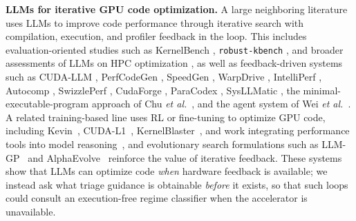 \noindent\textbf{LLMs for iterative GPU code optimization.}
A large neighboring literature uses LLMs to improve code performance through iterative search with compilation, execution, and profiler feedback in the loop.
This includes evaluation-oriented studies such as KernelBench \cite{ouyangKernelBenchCanLLMs2025}, \texttt{robust-kbench} \cite{langeRobustAgenticCUDA2025}, and broader assessments of LLMs on HPC optimization \cite{bowencuiLargeLanguageModels2025,cuiComprehensiveEvaluationLLMs2025}, as well as feedback-driven systems such as CUDA-LLM \cite{chenCUDALLMLLMsCan2025}, PerfCodeGen \cite{pengPerfCodeGenImprovingPerformance2025}, SpeedGen \cite{purschkeSpeedGenEnhancingCode2025}, WarpDrive \cite{damaniWarpDriveAgenticWorkflow}, IntelliPerf \cite{awadIntelliPerfLLMPoweredAutonomous2025}, Autocomp \cite{hongAutocompPowerfulPortable2025}, SwizzlePerf \cite{tschandSwizzlePerfHardwareAwareLLMs2025}, CudaForge \cite{zhangCudaForgeAgentFramework2025}, ParaCodex \cite{kaplanParaCodexProfilingGuidedAutonomous2026}, SysLLMatic \cite{pengSysLLMaticLargeLanguage2025}, the minimal-executable-program approach of Chu \textit{et al.}~\cite{chuGPUKernelOptimization2025}, and the agent system of Wei \textit{et al.}~\cite{weiImprovingParallelProgram2024}.
A related training-based line uses RL or fine-tuning to optimize GPU code, including Kevin~\cite{baronioKevinMultiTurnRL2025}, CUDA-L1~\cite{liCUDAL1ImprovingCUDA2026}, KernelBlaster~\cite{dongKernelBlasterContinualCrossTask2026}, and work integrating performance tools into model reasoning~\cite{nicholsIntegratingPerformanceTools2025}, and evolutionary search formulations such as LLM-GP~\cite{hembergEvolvingCodeLarge2024} and AlphaEvolve~\cite{novikovAlphaEvolveCodingAgent2025} reinforce the value of iterative feedback.
These systems show that LLMs can optimize code \emph{when} hardware feedback is available; we instead ask what triage guidance is obtainable \emph{before} it exists, so that such loops could consult an execution-free regime classifier when the accelerator is unavailable.






